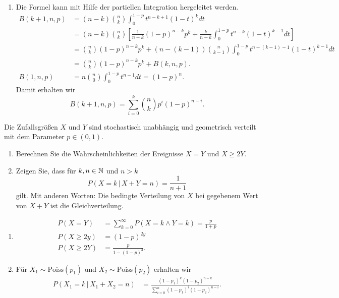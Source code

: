 \solution
\begin{enumerate}
    \item Die Formel kann mit Hilfe der partiellen Integration hergeleitet werden.
        \begin{align*}
            B(k+1, n, p) &= (n-k) \binom{n}{k} \int_{0}^{1-p} t^{n-k+1} (1-t)^{k} dt \\
            &= (n-k)\binom{n}{k} \left[  \frac{1}{n-k}(1-p)^{n-k} p^{k} + 
            \frac{k}{n-k} \int_{0}^{1-p} t^{n-k} (1-t)^{k-1} dt \right] \\
            &= \binom{n}{k} (1-p)^{n-k} p^{k} + 
            (n-(k-1)) \binom{n}{k-1} \int_{0}^{1-p} t^{n-(k-1)-1} (1-t)^{k-1} dt \\
            &= \binom{n}{k} (1-p)^{n-k} p^{k} + B(k, n, p). \\
            B(1,n,p) &= n \binom{n}{0} \int_{0}^{1-p} t^{n-1} dt = (1-p)^n.
        \end{align*}
        Damit erhalten wir
        \begin{equation*}
            B(k+1, n,p) = \sum_{i=0}^{k} \binom{n}{k} p^{i}(1-p)^{n-i}.
        \end{equation*}
\end{enumerate}

Die Zufallsgrößen $X$ und $Y$ sind stochastisch unabhängig und geometrisch verteilt mit dem Parameter $p\in(0,1)$.
\begin{enumerate}
    \item Berechnen Sie die Wahrscheinlichkeiten der Ereignisse $X=Y$ und
        $X\geq 2Y$.

    \item Zeigen Sie, dass für $k,n\in\mathbb N$ und $n>k$
        \begin{equation*}
            P \left( X = k \,|\, X+Y = n \right) = \frac{1}{n+1}
        \end{equation*}
        gilt. Mit anderen Worten: Die bedingte Verteilung von $X$ bei gegebenem Wert von 
        $X+Y$ ist die Gleichverteilung.
\end{enumerate}

\solution
\begin{enumerate}
    \item \begin{align*}
            P\left( X = Y \right) &= \sum_{k=0}^{\infty} P\left( X=k \wedge Y=k \right) = \frac{p}{1+p} \\
            P\left( X \geq 2y \right) &= \left( 1-p \right)^{2y} \\
            P\left( X \geq 2Y \right) &= \frac{p}{1- (1-p)^{3}}.
        \end{align*}

    \item Für $X_1 \sim \text{Poiss}(p_1)$ und $X_2\sim\text{Poiss}(p_2)$ erhalten wir
        \begin{align*}
            P\left( X_1 = k \,|\, X_1+X_2 = n \right) &= 
            \frac{(1-p_1)^{k} (1-p_2)^{n-k}  }{ \sum_{i=0}^{n} (1-p_1)^i (1-p_2)^{n-i} }. 
        \end{align*}
\end{enumerate}


